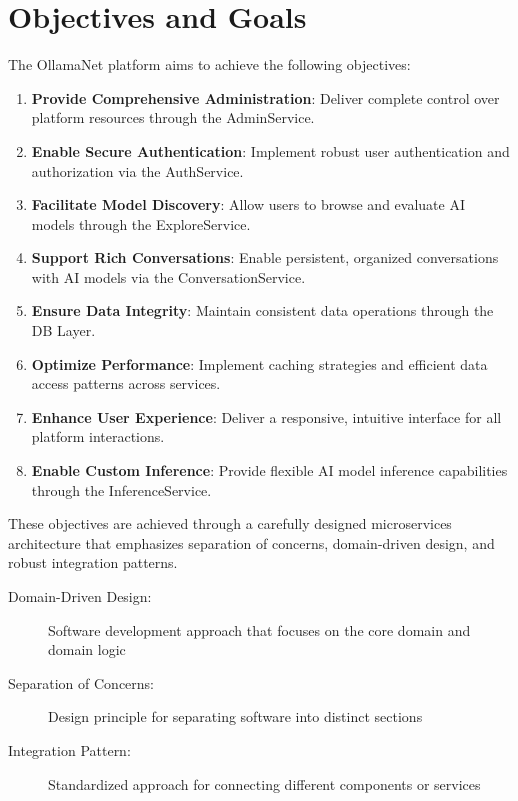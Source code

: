 \section{Objectives and Goals}

The OllamaNet platform aims to achieve the following objectives:

\begin{enumerate}
    \item \textbf{Provide Comprehensive Administration}: Deliver complete control over platform resources through the AdminService.
    \item \textbf{Enable Secure Authentication}: Implement robust user authentication and authorization via the AuthService.
    \item \textbf{Facilitate Model Discovery}: Allow users to browse and evaluate AI models through the ExploreService.
    \item \textbf{Support Rich Conversations}: Enable persistent, organized conversations with AI models via the ConversationService.
    \item \textbf{Ensure Data Integrity}: Maintain consistent data operations through the DB Layer.
    \item \textbf{Optimize Performance}: Implement caching strategies and efficient data access patterns across services.
    \item \textbf{Enhance User Experience}: Deliver a responsive, intuitive interface for all platform interactions.
    \item \textbf{Enable Custom Inference}: Provide flexible AI model inference capabilities through the InferenceService.
\end{enumerate}

These objectives are achieved through a carefully designed microservices architecture that emphasizes separation of concerns, domain-driven design, and robust integration patterns.

\begin{terminology}
\begin{description}
    \item[Domain-Driven Design:] Software development approach that focuses on the core domain and domain logic
    \item[Separation of Concerns:] Design principle for separating software into distinct sections
    \item[Integration Pattern:] Standardized approach for connecting different components or services
\end{description}
\end{terminology}

